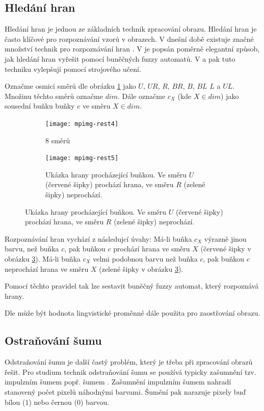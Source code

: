 \documentclass[a4paper,10pt]{article}
\begin{document}
\subsection{Hledání hran}
Hledání hran je jednou ze základních technik zpracování obrazu. Hledání hran je často klíčové pro rozpoznávání vzorů v obrazech. V dnešní době existuje značné množství technik pro rozpoznávání hran \cite{MaiAgg-StuComVarImDetEdTec}. V \cite{MarMeySol-HybMetGasDifModFuzCelAutImSha} je popsán poměrně elegantní způsob, jak hledání hran vyřešit pomocí buněčných fuzzy automatů. V \cite{PatMor-EdgDetTecFuzzLogCEllLeaAutFuzzImPro} a \cite{PatMor-EdgDetTecFuzzLogCEllLeaAutFuzzImPro} pak tuto techniku vylepšují pomocí strojového učení.

Označme osmici směrů dle obrázku \ref{img:Directions:8Directions} jako $U$, $UR$, $R$, $BR$, $B$, $BL$ $L$ a $UL$. Množinu těchto směrů označme $dim$. Dále označme $c_X$ (kde $X \in dim$) jako sousední buňku buňky $c$ ve směru $X \in dim$.

\begin{figure}
   \begin{subfigure}[t]{0.4\textwidth}
      \texttt{[image: mpimg-rest4]}
      \caption{8 směrů}  \label{img:Directions:8Directions}
    \end{subfigure}%
%
    \begin{subfigure}[t]{0.4\textwidth}
      \texttt{[image: mpimg-rest5]}
      \caption{Ukázka hrany procházející buňkou. Ve směru $U$ (červené šipky) prochází hrana, ve směru $R$ (zelené šipky) neprochází.}  \label{img:Directions:Edges}
    \end{subfigure}
\end{figure}

Rozpoznávání hran vychází z následujcí úvahy: Má-li buňka $c_X$ výrazně jinou barvu, než buňka $c$, pak buňkou $c$ prochází hrana ve směru $X$ (červené šipky v obrázku \ref{img:Directions:Edges}). Má-li buňka $c_X$ velmi podobnou barvu než buňka $c$, pak buňkou $c$ neprochází hrana ve směru $X$ (zelené šipky v obrázku \ref{img:Directions:Edges}). 

Pomocí těchto pravidel tak lze sestavit buněčný fuzzy automat, který rozpoznává hrany. 

Dle \cite{MarMeySol-HybMetGasDifModFuzCelAutImSha} může být hodnota lingvistické proměnné  dále použita pro zaostřování obrazu.

\subsection{Ostraňování šumu} \label{subs:NoisRem}
Odstraňování šumu je další častý problém, který je třeba při zpracování obrazů řešit. Pro studium technik odstraňování šumu se používá typicky zašumnění tzv. impulzním šumem popř. šumem . Zašumnění impulzním šumem nahradí stanovený počet pixelů náhodnými barvami. Šumění  pak narazuje pixely buď bílou ($1$) nebo černou ($0$) barvou.
\end{document}
